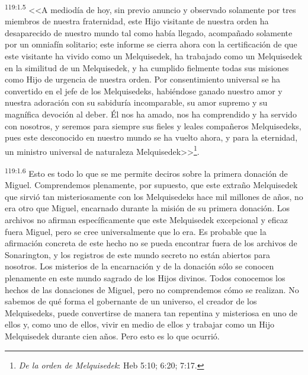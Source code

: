 \par
\textsuperscript{119:1.5} <<A mediodía de hoy, sin previo anuncio y observado solamente por tres miembros de nuestra fraternidad, este Hijo visitante de nuestra orden ha desaparecido de nuestro mundo tal como había llegado, acompañado solamente por un omniafín solitario; este informe se cierra ahora con la certificación de que este visitante ha vivido como un Melquisedek, ha trabajado como un Melquisedek en la similitud de un Melquisedek, y ha cumplido fielmente todas sus misiones como Hijo de urgencia de nuestra orden. Por consentimiento universal se ha convertido en el jefe de los Melquisedeks, habiéndose ganado nuestro amor y nuestra adoración con su sabiduría incomparable, su amor supremo y su magnífica devoción al deber. Él nos ha amado, nos ha comprendido y ha servido con nosotros, y seremos para siempre sus fieles y leales compañeros Melquisedeks, pues este desconocido en nuestro mundo se ha vuelto ahora, y para la eternidad, un ministro universal de naturaleza Melquisedek>>\footnote{\textit{De la orden de Melquisedek}: Heb 5:10; 6:20; 7:17.}.

\par
\textsuperscript{119:1.6} Esto es todo lo que se me permite deciros sobre la primera donación de Miguel. Comprendemos plenamente, por supuesto, que este extraño Melquisedek que sirvió tan misteriosamente con los Melquisedeks hace mil millones de años, no era otro que Miguel, encarnado durante la misión de su primera donación. Los archivos no afirman específicamente que este Melquisedek excepcional y eficaz fuera Miguel, pero se cree universalmente que lo era. Es probable que la afirmación concreta de este hecho no se pueda encontrar fuera de los archivos de Sonarington, y los registros de este mundo secreto no están abiertos para nosotros. Los misterios de la encarnación y de la donación sólo se conocen plenamente en este mundo sagrado de los Hijos divinos. Todos conocemos los hechos de las donaciones de Miguel, pero no comprendemos cómo se realizan. No sabemos de qué forma el gobernante de un universo, el creador de los Melquisedeks, puede convertirse de manera tan repentina y misteriosa en uno de ellos y, como uno de ellos, vivir en medio de ellos y trabajar como un Hijo Melquisedek durante cien años. Pero esto es lo que ocurrió.


